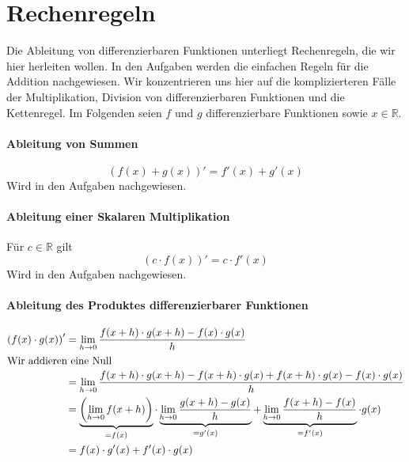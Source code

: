 \section{Rechenregeln}

Die Ableitung von differenzierbaren Funktionen unterliegt Rechenregeln, die wir hier herleiten wollen. In den Aufgaben werden die einfachen Regeln für die Addition nachgewiesen. Wir konzentrieren uns hier auf die komplizierteren Fälle der Multiplikation, Division von differenzierbaren Funktionen und die Kettenregel. Im Folgenden seien $f$ und $g$ differenzierbare Funktionen sowie $x\in \mathbb{R}$.

\paragraph{Ableitung von Summen}
\begin{equation}\label{eq:diff0}
\left(f(x)+g(x) \right)' = f'(x)+ g'(x)
\end{equation}
Wird in den Aufgaben nachgewiesen.

\paragraph{Ableitung einer Skalaren Multiplikation}
Für $c\in \mathbb{R}$ gilt
\begin{equation}\label{eq:diff1}
\left(c\cdot f(x)\right)' = c \cdot f'(x)
\end{equation}
Wird in den Aufgaben nachgewiesen.

\paragraph{Ableitung des Produktes differenzierbarer Funktionen}
\begin{equation}
\begin{split}\label{eq:diff2}
\left(f(x) \cdot g(x) \right)' &= \lim\limits_{h\rightarrow 0} \frac{f(x+h)\cdot g(x+h)-f(x)\cdot g(x)}{h} \\
\intertext{Wir addieren eine Null}
&= \lim\limits_{h\rightarrow 0} \frac{f(x+h)\cdot g(x+h) -f(x+h)\cdot g(x)+f(x+h)\cdot g(x) - f(x)\cdot g(x)}{h} \\
&= \underbrace{\left( \lim\limits_{h\rightarrow 0}f(x+h)\right)}_{=f(x)} \cdot 
\underbrace{\lim\limits_{h\rightarrow 0} \frac{g(x+h)-g(x)}{h}}_{=g'(x)} +\underbrace{\lim\limits_{h\rightarrow 0} \frac{f(x+h)-f(x)}{h}}_{=f'(x)} \cdot g(x)\\
&= f(x)\cdot g'(x) + f'(x)\cdot g(x)
\end{split}
\end{equation}

